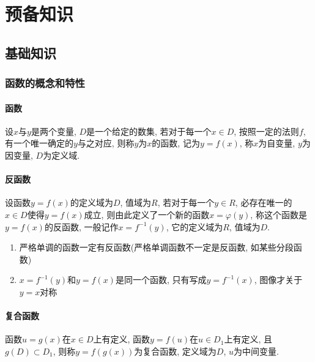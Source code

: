\chapter{预备知识}
\section{基础知识}
\subsection{函数的概念和特性}
\subsubsection{函数}
设$ x $与$ y $是两个变量, $ D $是一个给定的数集, 若对于每一个$ x\in D $, 按照一定的法则$ f $, 有一个唯一确定的$ y $与之对应, 则称$ y $为$ x $的函数, 记为$ y=f(x) $, 称$ x $为自变量, $ y $为因变量, $ D $为定义域.
\subsubsection{反函数}
设函数$ y=f(x) $的定义域为$ D $, 值域为$ R $, 若对于每一个$ y\in R $, 必存在唯一的$ x\in D $使得$ y=f(x) $成立, 则由此定义了一个新的函数$ x=\varphi(y) $, 称这个函数是$ y=f(x) $的反函数, 一般记作$ x=f^{-1}(y) $, 它的定义域为$ R $, 值域为$ D $. \par
\begin{tcolorbox}
\begin{enumerate}
\item 严格单调的函数一定有反函数(严格单调函数不一定是反函数, 如某些分段函数)
\item $ x=f^{-1}(y) $和$ y=f(x) $是同一个函数, 只有写成$ y=f^{-1}(x) $, 图像才关于$ y=x $对称
\end{enumerate}
\end{tcolorbox}
\subsubsection{复合函数}
函数$ u=g(x) $在$ x\in D $上有定义, 函数$ y=f(u) $在$ u\in D_{1} $上有定义, 且$ g(D)\subset D_{1} $, 则称$ y=f(g(x)) $为复合函数, 定义域为$ D $, $ u $为中间变量.
